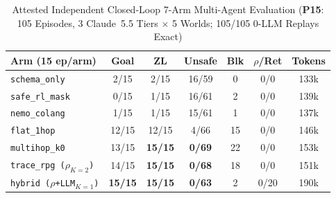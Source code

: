 \begin{table}[!tbp]
\caption{Attested Independent Closed-Loop 7-Arm Multi-Agent Evaluation (\textbf{P15}: 105 Episodes, 3 Claude~5.5 Tiers $\times$ 5 Worlds; 105/105 0-LLM Replays Exact)}
\label{tab:phase5-aamas-mas}
\centering
\scriptsize
\setlength{\tabcolsep}{2.2pt}
\begin{tabularx}{\columnwidth}{@{}>{\raggedright\arraybackslash}Xcccccc@{}}
\toprule
\textbf{Arm (15 ep/arm)} & \textbf{Goal} & \textbf{ZL} & \textbf{Unsafe} & \textbf{Blk} & \textbf{$\rho$/Ret} & \textbf{Tokens} \\
\midrule
\texttt{schema\_only} & 2/15 & 2/15 & 16/59 & 0 & 0/0 & 133k \\
\texttt{safe\_rl\_mask}~\cite{alshiekh2018shield} & 0/15 & 1/15 & 16/61 & 2 & 0/0 & 139k \\
\texttt{nemo\_colang}~\cite{rebedea2023nemo} & 1/15 & 1/15 & 15/61 & 1 & 0/0 & 137k \\
\texttt{flat\_1hop} & 12/15 & 12/15 & 4/66 & 15 & 0/0 & 146k \\
\texttt{multihop\_k0} & 13/15 & \textbf{15/15} & \textbf{0/69} & 22 & 0/0 & 153k \\
\texttt{trace\_rpg ($\rho_{K=2}$)} & 14/15 & \textbf{15/15} & \textbf{0/68} & 18 & 0/0 & 151k \\
\texttt{hybrid ($\rho$+LLM$_{K=1}$)} & \textbf{15/15} & \textbf{15/15} & \textbf{0/63} & 2 & 0/20 & 190k \\
\bottomrule
\end{tabularx}
\end{table}


